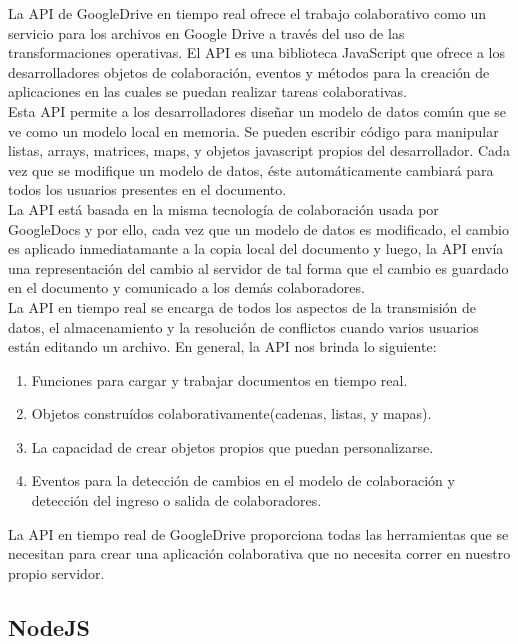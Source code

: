 La API de GoogleDrive en tiempo real ofrece el trabajo colaborativo como un servicio para los archivos en Google Drive a través del uso de las transformaciones operativas. El API es una biblioteca JavaScript que ofrece a los desarrolladores objetos de colaboración, eventos y métodos para la creación de aplicaciones en las cuales se puedan realizar tareas colaborativas.\\

Esta API permite a los desarrolladores diseñar un modelo de datos común que se ve como un modelo local en memoria. Se pueden escribir código para manipular listas, arrays, matrices, maps, y objetos javascript propios del desarrollador. Cada vez que se modifique un modelo de datos, éste automáticamente cambiará para todos los usuarios presentes en el documento.\\

La API está basada en la misma tecnología de colaboración usada por GoogleDocs y por ello, cada vez que un modelo de datos es modificado, el cambio es aplicado inmediatamante a la copia local del documento y luego, la API envía una representación del cambio al servidor de tal forma que el cambio es guardado en el documento y comunicado a los demás colaboradores.\\

La API en tiempo real se encarga de todos los aspectos de la transmisión de datos, el almacenamiento y la resolución de conflictos cuando varios usuarios están editando un archivo. En general, la API nos brinda lo siguiente:

\begin{enumerate}
  \item Funciones para cargar y trabajar documentos en tiempo real.
  \item Objetos construídos colaborativamente(cadenas, listas, y mapas).
  \item La capacidad de crear objetos propios que puedan personalizarse.
  \item Eventos para la detección de cambios en el modelo de colaboración y detección del ingreso o salida de colaboradores.
\end{enumerate}
La API en tiempo real de GoogleDrive proporciona todas las herramientas que se necesitan para crear una aplicación colaborativa que no necesita correr en nuestro propio servidor.



\subsection{NodeJS}
